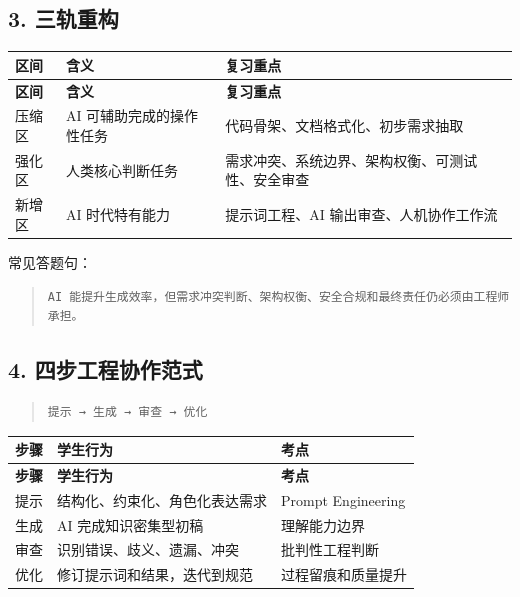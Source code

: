 \documentclass[UTF8,zihao=-4]{ctexart}
\begin{document}
\subsection{3. 三轨重构}

{
\footnotesize
\begin{longtable}{|>{\raggedright\arraybackslash}p{}|>{\raggedright\arraybackslash}p{}|>{\raggedright\arraybackslash}p{}|}
\hline
\textbf{区间} & \textbf{含义} & \textbf{复习重点} \\
\hline
\endfirsthead
\hline
\textbf{区间} & \textbf{含义} & \textbf{复习重点} \\
\hline
\endhead
压缩区 & AI 可辅助完成的操作性任务 & 代码骨架、文档格式化、初步需求抽取 \\
\hline
强化区 & 人类核心判断任务 & 需求冲突、系统边界、架构权衡、可测试性、安全审查 \\
\hline
新增区 & AI 时代特有能力 & 提示词工程、AI 输出审查、人机协作工作流 \\
\hline
\end{longtable}
}


常见答题句：

\begin{quote}
\footnotesize
\begin{verbatim}
AI 能提升生成效率，但需求冲突判断、架构权衡、安全合规和最终责任仍必须由工程师承担。
\end{verbatim}
\end{quote}

\subsection{4. 四步工程协作范式}

\begin{quote}
\footnotesize
\begin{verbatim}
提示 → 生成 → 审查 → 优化
\end{verbatim}
\end{quote}

{
\footnotesize
\begin{longtable}{|>{\raggedright\arraybackslash}p{}|>{\raggedright\arraybackslash}p{}|>{\raggedright\arraybackslash}p{}|}
\hline
\textbf{步骤} & \textbf{学生行为} & \textbf{考点} \\
\hline
\endfirsthead
\hline
\textbf{步骤} & \textbf{学生行为} & \textbf{考点} \\
\hline
\endhead
提示 & 结构化、约束化、角色化表达需求 & Prompt Engineering \\
\hline
生成 & AI 完成知识密集型初稿 & 理解能力边界 \\
\hline
审查 & 识别错误、歧义、遗漏、冲突 & 批判性工程判断 \\
\hline
优化 & 修订提示词和结果，迭代到规范 & 过程留痕和质量提升 \\
\hline
\end{longtable}
}
\end{document}
